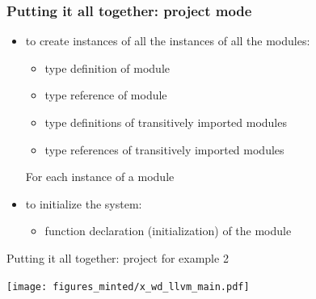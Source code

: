 \documentclass[12pt]{beamer}
\begin{document}
\begin{frame}

  \frametitle{Putting it all together: project mode}

  \begin{itemize}
    \item to create instances of all the instances of all the
      modules:
      \begin{itemize}
        \item type definition of module
        \item type reference of module
        \item type definitions of transitively imported modules
        \item type references of transitively imported modules
      \end{itemize}
      For each instance  of a module 

      {\small 
        \textcolor{blue}{}}

    \item to initialize the system:
      \begin{itemize}
      \item function declaration (initialization)
        of the module
      \end{itemize}

      {\small 
        \textcolor{blue}{}

        \textcolor{blue}{}

        \textcolor{blue}{}

        \textcolor{blue}{\llvm{\}}}
        }

  \end{itemize}

\end{frame}

\begin{frame}{Putting it all together: project for example 2}

  \texttt{[image: figures\_minted/x\_wd\_llvm\_main.pdf]}

\end{frame}
\end{document}
